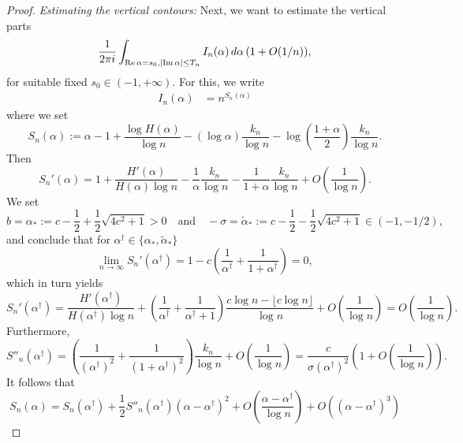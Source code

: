 \documentclass[10pt,a4paper]{amsart}
\newcommand{\dint}{\textup{d}}
\begin{document}
\begin{proof}
\emph{Estimating the vertical contours:}
Next, we want to estimate the vertical parts
\begin{equation*}
    \frac{1}{2\pi i}\int_{\mathrm{Re}\, \alpha=s_0, |\mathrm{Im}\,\alpha|\leq T_n} I_n(\alpha)\, \dint \alpha\, (1+O(1/n)),
\end{equation*}
for suitable fixed $s_0\in (-1,+\infty)$.
For this, we write
    \begin{align*}
        I_n(\alpha)&= n^{S_n(\alpha)}
    \end{align*}
where we set
\begin{equation*}
    S_n(\alpha) := \alpha - 1 + \frac{\log H(\alpha)}{\log n}-(\log \alpha) \frac{k_n}{\log n} - \log\left(\frac{1+\alpha}{2}\right)\frac{k_n}{\log n}.
\end{equation*}
Then
\begin{equation*}
    S_n'(\alpha) = 1 + \frac{H'(\alpha)}{H(\alpha)\log n} - \frac{1}{\alpha} \frac{k_n}{\log n} - \frac{1}{1+\alpha} \frac{k_n}{\log n} + O\left(\frac{1}{\log n}\right).
\end{equation*}
We set
\begin{equation*}
    b=\alpha_* := c-\frac{1}{2}+\frac{1}{2}\sqrt{4c^2+1} >0 \quad \text{and}\quad
    -\sigma=\tilde{\alpha}_* := c-\frac{1}{2}-\frac{1}{2}\sqrt{4c^2+1} \in (-1,-1/2),
\end{equation*}
and conclude that for $\alpha^\dag\in\{\alpha_*,\tilde{\alpha}_*\}$
\begin{equation*}
    \lim_{n\to\infty} S_n'(\alpha^\dag) = 1-c\left(\frac{1}{\alpha^\dag} +\frac{1}{1+\alpha^\dag}\right)=0,
\end{equation*}
which in turn yields
    \begin{equation*}
        S_n'(\alpha^\dag) = \frac{H'(\alpha^\dag)}{H(\alpha^\dag)\log n} + \left(\frac{1}{\alpha^\dag} +\frac{1}{\alpha^\dag+1}\right) \frac{c\log n-\lfloor c\log n\rfloor}{\log n} 
             + O\left(\frac{1}{\log n}\right) 
            = O\left(\frac{1}{\log n}\right).
    \end{equation*}
    Furthermore,
    \begin{equation*}
        S''_n(\alpha^\dag) = \left(\frac{1}{(\alpha^\dag)^2} + \frac{1}{(1+\alpha^\dag)^2}\right) \frac{k_n}{\log n} + O\left(\frac{1}{\log n}\right) 
        = \frac{c}{\sigma(\alpha^\dag)^2} \left(1+ O\left(\frac{1}{\log n}\right)\right).
    \end{equation*}
    It follows that
    \begin{equation*}
        S_n(\alpha) = S_n(\alpha^\dag) + \frac{1}{2} S''_n(\alpha^\dag) (\alpha-\alpha^\dag)^2 + O\left(\frac{\alpha-\alpha^\dag}{\log n}\right) + O((\alpha-\alpha^\dag)^3)

\end{equation*}
\end{proof}
\end{document}
